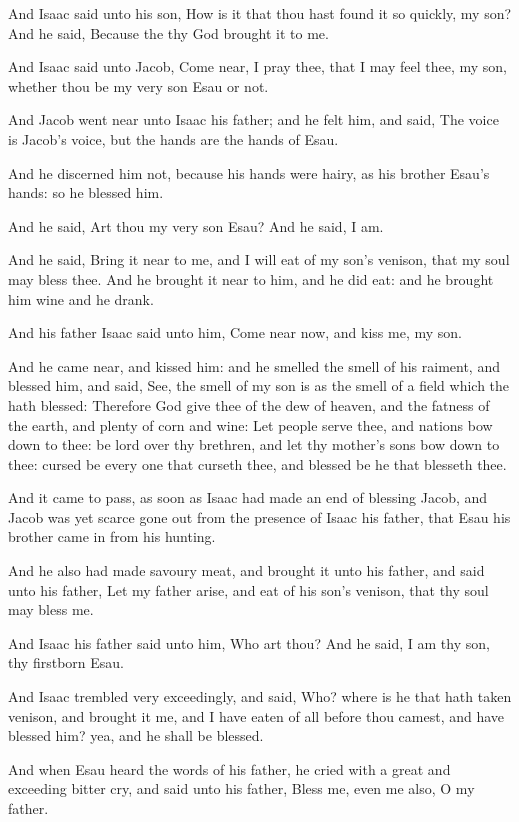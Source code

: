 \verse And Isaac said unto his son, How is it that thou hast found it
so quickly, my son? And he said, Because the \LORD thy God brought it
to me.

\verse And Isaac said unto Jacob, Come near, I pray thee, that I may
feel thee, my son, whether thou be my very son Esau or not.

\verse And Jacob went near unto Isaac his father; and he felt him, and
said, The voice is Jacob's voice, but the hands are the hands of Esau.

\verse And he discerned him not, because his hands were hairy, as his
brother Esau's hands: so he blessed him.

\verse And he said, Art thou my very son Esau? And he said, I am.

\verse And he said, Bring it near to me, and I will eat of my son's
venison, that my soul may bless thee. And he brought it near to him,
and he did eat: and he brought him wine and he drank.

\verse And his father Isaac said unto him, Come near now, and kiss me,
my son.

\verse And he came near, and kissed him: and he smelled the smell of
his raiment, and blessed him, and said, See, the smell of my son is as
the smell of a field which the \LORD hath blessed: \verse Therefore God
give thee of the dew of heaven, and the fatness of the earth, and
plenty of corn and wine: \verse Let people serve thee, and nations bow
down to thee: be lord over thy brethren, and let thy mother's sons bow
down to thee: cursed be every one that curseth thee, and blessed be he
that blesseth thee.

\verse And it came to pass, as soon as Isaac had made an end of
blessing Jacob, and Jacob was yet scarce gone out from the presence of
Isaac his father, that Esau his brother came in from his hunting.

\verse And he also had made savoury meat, and brought it unto his
father, and said unto his father, Let my father arise, and eat of his
son's venison, that thy soul may bless me.

\verse And Isaac his father said unto him, Who art thou? And he said, I
am thy son, thy firstborn Esau.

\verse And Isaac trembled very exceedingly, and said, Who? where is he
that hath taken venison, and brought it me, and I have eaten of all
before thou camest, and have blessed him? yea, and he shall be
blessed.

\verse And when Esau heard the words of his father, he cried with a
great and exceeding bitter cry, and said unto his father, Bless me,
even me also, O my father.

